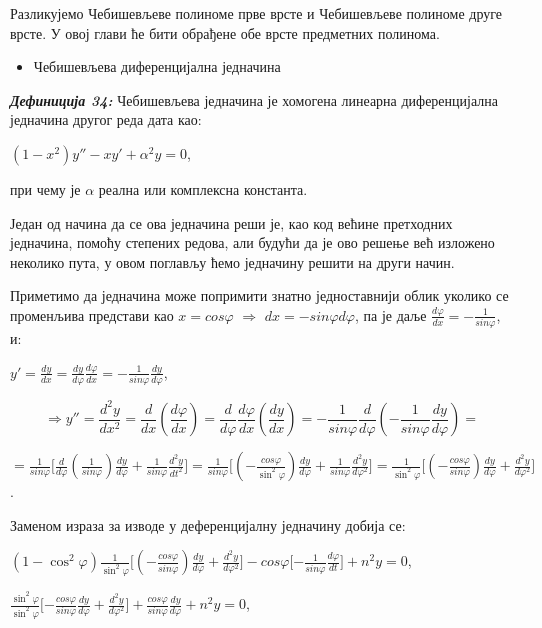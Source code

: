 Разликујемо Чебишевљеве полиноме прве врсте и Чебишевљеве полиноме друге
врсте. У овој глави ће бити обрађене обе врсте предметних полинома.

\begin{itemize}
\item
  Чебишевљева диференцијална једначина
\end{itemize}

\emph{\textbf{Дефиниција 34:}} Чебишевљева једначина је хомогена
линеарна диференцијална једначина другог реда дата као:

\((1 - x^{2})y'' - xy' + \alpha^{2}y = 0\),

при чему је \(\alpha\) реална или комплексна константа.

Један од начина да се ова једначина реши је, као код већине претходних
једначина, помоћу степених редова, али будући да је ово решење већ
изложено неколико пута, у овом поглављу ћемо једначину решити на други
начин.

Приметимо да једначина може попримити знатно једноставнији облик уколико
се променљива представи као \(x = cos\varphi\) \(\Rightarrow\)
\(dx = - sin\varphi d\varphi\), па је даље
\(\frac{d\varphi}{dx} = - \frac{1}{sin\varphi}\), и:

\(y' = \frac{dy}{dx} = \frac{dy}{d\varphi}\frac{d\varphi}{dx} = - \frac{1}{sin\varphi}\frac{dy}{d\varphi}\),

\[\Rightarrow y'' = \frac{d^{2}y}{dx^{2}} = \frac{d}{dx}(\frac{d\varphi}{dx}) = \frac{d}{d\varphi}\frac{d\varphi}{dx}(\frac{dy}{dx}) = - \frac{1}{sin\varphi}\frac{d}{d\varphi}( - \frac{1}{sin\varphi}\frac{dy}{d\varphi}) =\]

\(= \frac{1}{sin\varphi}\lbrack\frac{d}{d\varphi}\left( \frac{1}{sin\varphi} \right)\frac{dy}{d\varphi} + \frac{1}{sin\varphi}\frac{d^{2}y}{dt^{2}}\rbrack = \frac{1}{sin\varphi}\lbrack( - \frac{cos\varphi}{\sin^{2}\varphi})\frac{dy}{d\varphi} + \frac{1}{sin\varphi}\frac{d^{2}y}{d\varphi^{2}}\rbrack = \frac{1}{\sin^{2}\varphi}\lbrack( - \frac{cos\varphi}{sin\varphi})\frac{dy}{d\varphi} + \frac{d^{2}y}{d\varphi^{2}}\rbrack\).

Заменом израза за изводе у деференцијалну једначину добија се:

\((1 - \cos^{2}\varphi)\frac{1}{\sin^{2}\varphi}\lbrack( - \frac{cos\varphi}{sin\varphi})\frac{dy}{d\varphi} + \frac{d^{2}y}{d\varphi^{2}}\rbrack - cos\varphi\lbrack - \frac{1}{sin\varphi}\frac{d\varphi}{dt}\rbrack + n^{2}y = 0\),

\(\frac{\sin^{2}\varphi}{\sin^{2}\varphi}\lbrack - \frac{cos\varphi}{sin\varphi}\frac{dy}{d\varphi} + \frac{d^{2}y}{d\varphi^{2}}\rbrack + \frac{cos\varphi}{sin\varphi}\frac{dy}{d\varphi} + n^{2}y = 0\),

